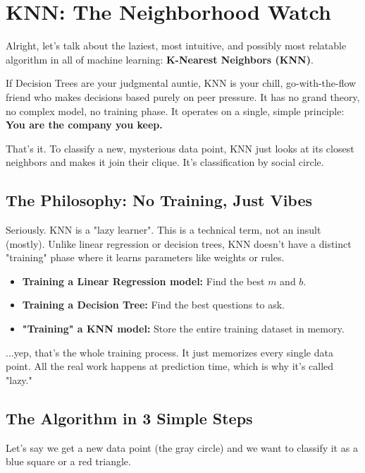 \documentclass[11pt, letterpaper, openany]{book}
\begin{document}
\chapter{KNN: The Neighborhood Watch}

Alright, let's talk about the laziest, most intuitive, and possibly most relatable algorithm in all of machine learning: \textbf{K-Nearest Neighbors (KNN)}.

If Decision Trees are your judgmental auntie, KNN is your chill, go-with-the-flow friend who makes decisions based purely on peer pressure. It has no grand theory, no complex model, no training phase. It operates on a single, simple principle: \textbf{You are the company you keep.}

That's it. To classify a new, mysterious data point, KNN just looks at its closest neighbors and makes it join their clique. It's classification by social circle.

\section{The Philosophy: No Training, Just Vibes}

Seriously. KNN is a "lazy learner". This is a technical term, not an insult (mostly). Unlike linear regression or decision trees, KNN doesn't have a distinct "training" phase where it learns parameters like weights or rules.
\begin{itemize}
    \item \textbf{Training a Linear Regression model:} Find the best $m$ and $b$.
    \item \textbf{Training a Decision Tree:} Find the best questions to ask.
    \item \textbf{"Training" a KNN model:} Store the entire training dataset in memory.
\end{itemize}
...yep, that's the whole training process. It just memorizes every single data point. All the real work happens at prediction time, which is why it's called "lazy."

\section{The Algorithm in 3 Simple Steps}

Let's say we get a new data point (the gray circle) and we want to classify it as a blue square or a red triangle.
\end{document}
